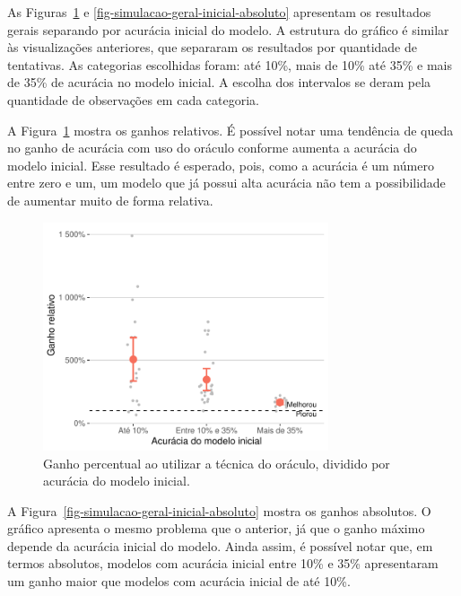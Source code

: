 \documentclass[12pt,twoside,brazilian]{book}
\begin{document}
As Figuras~\ref{fig-simulacao-geral-inicial-relativo} e
\ref{fig-simulacao-geral-inicial-absoluto} apresentam os resultados
gerais separando por acurácia inicial do modelo. A estrutura do gráfico
é similar às visualizações anteriores, que separaram os resultados por
quantidade de tentativas. As categorias escolhidas foram: até 10\%, mais
de 10\% até 35\% e mais de 35\% de acurácia no modelo inicial. A escolha
dos intervalos se deram pela quantidade de observações em cada
categoria.

A Figura~\ref{fig-simulacao-geral-inicial-relativo} mostra os ganhos
relativos. É possível notar uma tendência de queda no ganho de acurácia
com uso do oráculo conforme aumenta a acurácia do modelo inicial. Esse
resultado é esperado, pois, como a acurácia é um número entre zero e um,
um modelo que já possui alta acurácia não tem a possibilidade de
aumentar muito de forma relativa.

\begin{figure}

{\centering \includegraphics[width=0.75\textwidth,height=\textheight]{./resultados_files/figure-pdf/fig-simulacao-geral-inicial-relativo-1.pdf}

}

\caption{\label{fig-simulacao-geral-inicial-relativo}Ganho percentual ao
utilizar a técnica do oráculo, dividido por acurácia do modelo inicial.}

\end{figure}

A Figura~\ref{fig-simulacao-geral-inicial-absoluto} mostra os ganhos
absolutos. O gráfico apresenta o mesmo problema que o anterior, já que o
ganho máximo depende da acurácia inicial do modelo. Ainda assim, é
possível notar que, em termos absolutos, modelos com acurácia inicial
entre 10\% e 35\% apresentaram um ganho maior que modelos com acurácia
inicial de até 10\%.
\end{document}
